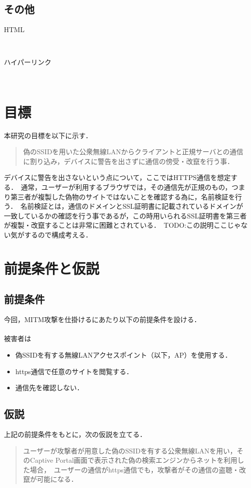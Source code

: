 \documentclass[dvipdfmx]{jsarticle}
\begin{document}
    \subsection{その他}
    \begin{description}
        \item[HTML]\mbox{}\\
        \item[ハイパーリンク]\mbox{}\\  
    \end{description}
    \section{目標}
    本研究の目標を以下に示す．
    \begin{quote}
        偽のSSIDを用いた公衆無線LANからクライアントと正規サーバとの通信に割り込み，デバイスに警告を出さずに通信の傍受・改竄を行う事．\
    \end{quote}
    デバイスに警告を出さないという点について，ここではHTTPS通信を想定する．\
    通常，ユーザーが利用するブラウザでは，その通信先が正規のもの，つまり第三者が複製した偽物のサイトではないことを確認する為に，名前検証を行う．\
    名前検証とは，通信のドメインとSSL証明書に記載されているドメインが一致しているかの確認を行う事であるが，この時用いられるSSL証明書を第三者が複製・改竄することは非常に困難とされている．\
    TODO:この説明ここじゃない気がするので構成考える．
    \section{前提条件と仮説}
    \subsection{前提条件}
    今回，MITM攻撃を仕掛けるにあたり以下の前提条件を設ける．\\
    \\
    被害者は
    \begin{itemize}
        \item 偽SSIDを有する無線LANアクセスポイント（以下，AP）を使用する．
        \item https通信で任意のサイトを閲覧する．
        \item 通信先を確認しない．
    \end{itemize}
    \subsection{仮説}
    上記の前提条件をもとに，次の仮説を立てる．
    \begin{quote}
        ユーザーが攻撃者が用意した偽のSSIDを有する公衆無線LANを用い，そのCaptive Portal画面で表示された偽の検索エンジンからネットを利用した場合，\
        ユーザーの通信がhttps通信でも，攻撃者がその通信の盗聴・改竄が可能になる．
    \end{quote}
\end{document}
